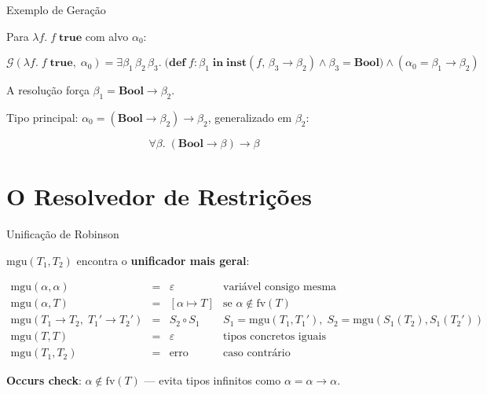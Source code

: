 \begin{frame}{Exemplo de Geração}

    Para \(\lambda f.\; f\; \mathbf{true}\) com alvo \(\alpha_0\):

    \[\mathcal{G}(\lambda f.\; f\; \mathbf{true},\; \alpha_0) = \exists \beta_1\, \beta_2\, \beta_3.\; \bigl(\mathbf{def}\; f : \beta_1\; \mathbf{in}\; \mathbf{inst}(f,\, \beta_3 \to \beta_2) \wedge \beta_3 = \mathbf{Bool}\bigr) \wedge (\alpha_0 = \beta_1 \to \beta_2)\]

    A resolução força \(\beta_1 = \mathbf{Bool} \to \beta_2\).

    Tipo principal: \(\alpha_0 = (\mathbf{Bool} \to \beta_2) \to \beta_2\),
    generalizado em \(\beta_2\):

    \[\forall \beta.\; (\mathbf{Bool} \to \beta) \to \beta\]
\end{frame}


\section{O Resolvedor de
Restrições}\label{o-resolvedor-de-restriuxe7uxf5es}

\begin{frame}{Unificação de Robinson}

    \(\mathrm{mgu}(T_1, T_2)\) encontra o \textbf{unificador mais geral}:

    \[\begin{array}{rcll}
    \mathrm{mgu}(\alpha, \alpha) & = & \varepsilon & \text{variável consigo mesma} \\
    \mathrm{mgu}(\alpha, T) & = & [\alpha \mapsto T] & \text{se } \alpha \notin \mathrm{fv}(T) \\
    \mathrm{mgu}(T_1 \to T_2,\; T_1' \to T_2') & = & S_2 \circ S_1 & S_1 = \mathrm{mgu}(T_1, T_1'),\; S_2 = \mathrm{mgu}(S_1(T_2), S_1(T_2')) \\
    \mathrm{mgu}(T, T) & = & \varepsilon & \text{tipos concretos iguais} \\
    \mathrm{mgu}(T_1, T_2) & = & \text{erro} & \text{caso contrário}
\end{array}\]

\textbf{Occurs check}: \(\alpha \notin \mathrm{fv}(T)\) --- evita tipos
infinitos como \(\alpha = \alpha \to \alpha\).
\end{frame}

